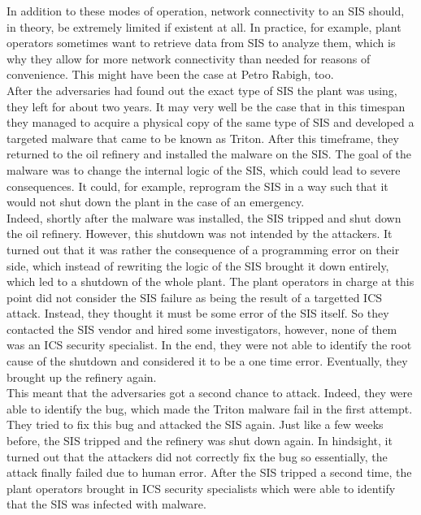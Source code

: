 \documentclass[runningheads]{llncs}
\begin{document}
In addition to these modes of operation, network connectivity to an SIS should, in theory, be extremely limited if existent at all.
In practice, for example, plant operators sometimes want to retrieve data from SIS to analyze them, which is why they allow for more network connectivity than needed for reasons of convenience.
This might have been the case at Petro Rabigh, too.
\cite{dragos.17}\\
After the adversaries had found out the exact type of SIS the plant was using, they left for about two years.
It may very well be the case that in this timespan they managed to acquire a physical copy of the same type of SIS and developed a targeted malware that came to be known as Triton.
After this timeframe, they returned to the oil refinery and installed the malware on the SIS.
The goal of the malware was to change the internal logic of the SIS, which could lead to severe consequences.
It could, for example, reprogram the SIS in a way such that it would not shut down the plant in the case of an emergency. \cite{lee.20}\\
Indeed, shortly after the malware was installed, the SIS tripped and shut down the oil refinery.
However, this shutdown was not intended by the attackers.
It turned out that it was rather the consequence of a programming error on their side, which instead of rewriting the logic of the SIS brought it down entirely, which led to a shutdown of the whole plant.
The plant operators in charge at this point did not consider the SIS failure as being the result of a targetted ICS attack.
Instead, they thought it must be some error of the SIS itself.
So they contacted the SIS vendor and hired some investigators, however, none of them was an ICS security specialist.
In the end, they were not able to identify the root cause of the shutdown and considered it to be a one time error.
Eventually, they brought up the refinery again. \cite{lee.20}\\
This meant that the adversaries got a second chance to attack.
Indeed, they were able to identify the bug, which made the Triton malware fail in the first attempt.
They tried to fix this bug and attacked the SIS again.
Just like a few weeks before, the SIS tripped and the refinery was shut down again.
In hindsight, it turned out that the attackers did not correctly fix the bug so essentially, the attack finally failed due to human error.
After the SIS tripped a second time, the plant operators brought in ICS security specialists which were able to identify that the SIS was infected with malware.
\end{document}
